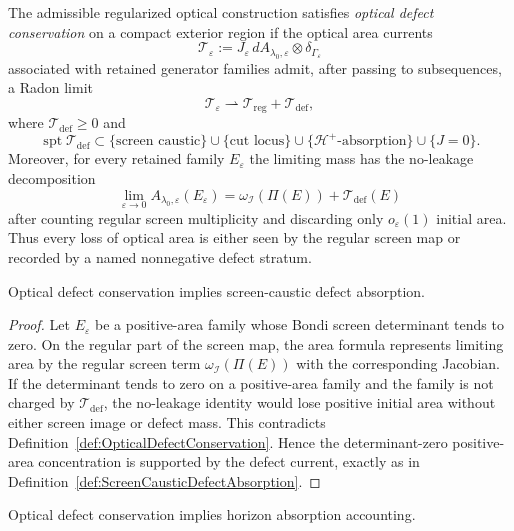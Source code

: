 \begin{definition}\label{def:OpticalDefectConservation}
The admissible regularized optical construction satisfies \emph{optical defect conservation} on a compact exterior region if the optical area currents
\[
    \mathcal T_\varepsilon
    :=
    J_\varepsilon\,dA_{\lambda_0,\varepsilon}\otimes\delta_{\Gamma_\varepsilon}
\]
associated with retained generator families admit, after passing to subsequences, a Radon limit
\[
    \mathcal T_\varepsilon
    \rightharpoonup
    \mathcal T_{\mathrm{reg}}+\mathcal T_{\mathrm{def}},
\]
where $\mathcal T_{\mathrm{def}}\ge0$ and
\[
    \operatorname{spt}\mathcal T_{\mathrm{def}}
    \subset
    \{\text{screen caustic}\}
    \cup
    \{\text{cut locus}\}
    \cup
    \{\mathcal H^+\text{-absorption}\}
    \cup
    \{J=0\}.
\]
Moreover, for every retained family $E_\varepsilon$ the limiting mass has the no-leakage decomposition
\[
    \lim_{\varepsilon\to0}A_{\lambda_0,\varepsilon}(E_\varepsilon)
    =
    \omega_{\mathscr I}(\Pi(E))
    +
    \mathcal T_{\mathrm{def}}(E)
\]
after counting regular screen multiplicity and discarding only $o_\varepsilon(1)$ initial area. Thus every loss of optical area is either seen by the regular screen map or recorded by a named nonnegative defect stratum.
\end{definition}

\begin{lemma}\label{lem:DefectConservationCausticAbsorption}
Optical defect conservation implies screen-caustic defect absorption.
\end{lemma}

\begin{proof}
Let $E_\varepsilon$ be a positive-area family whose Bondi screen determinant tends to zero. On the regular part of the screen map, the area formula represents limiting area by the regular screen term $\omega_{\mathscr I}(\Pi(E))$ with the corresponding Jacobian. If the determinant tends to zero on a positive-area family and the family is not charged by $\mathcal T_{\mathrm{def}}$, the no-leakage identity would lose positive initial area without either screen image or defect mass. This contradicts Definition~\ref{def:OpticalDefectConservation}. Hence the determinant-zero positive-area concentration is supported by the defect current, exactly as in Definition~\ref{def:ScreenCausticDefectAbsorption}.
\end{proof}

\begin{lemma}\label{lem:DefectConservationHorizonAccounting}
Optical defect conservation implies horizon absorption accounting.
\end{lemma}

